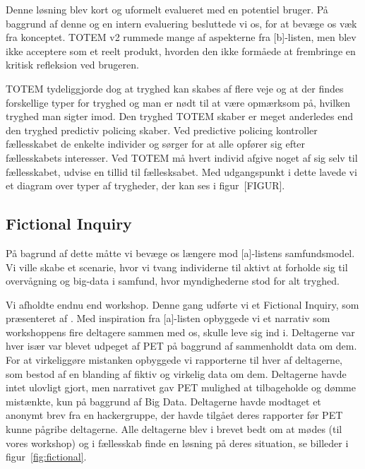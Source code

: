 Denne løsning blev kort og uformelt evalueret med en potentiel bruger. På baggrund af denne og en intern evaluering besluttede vi os, for at bevæge os væk fra konceptet. TOTEM v2 rummede mange af aspekterne fra [b]-listen, men blev ikke acceptere som et reelt produkt, hvorden den ikke formåede at frembringe en kritisk refleksion ved brugeren.

TOTEM tydeliggjorde dog at tryghed kan skabes af flere veje og at der findes forskellige typer for tryghed og man er nødt til at være opmærksom på, hvilken tryghed man sigter imod. Den tryghed TOTEM skaber er meget anderledes end den tryghed predictiv policing skaber. Ved predictive policing kontroller fællesskabet de enkelte individer og sørger for at alle opfører sig efter fællesskabets interesser. Ved TOTEM må hvert individ afgive noget af sig selv til fællesskabet, udvise en tillid til fællesksabet. Med udgangspunkt i dette lavede vi et diagram over typer af trygheder, der kan ses i figur~[FIGUR].


\subsection*{Fictional Inquiry}
På bagrund af dette måtte vi bevæge os længere mod [a]-listens samfundsmodel. Vi ville skabe et scenarie, hvor vi tvang individerne til aktivt at forholde sig til overvågning og big-data i samfund, hvor myndighederne stod for alt tryghed.

Vi afholdte endnu end workshop. Denne gang udførte vi et Fictional Inquiry, som præsenteret af \cite[]{Iversen:2008:PAI:1795234.1795254}. Med inspiration fra [a]-listen opbyggede vi et narrativ som workshoppens fire deltagere sammen med os, skulle leve sig ind i. Deltagerne var hver især var blevet udpeget af PET på baggrund af sammenholdt data om dem. For at virkeliggøre mistanken opbyggede vi rapporterne til hver af deltagerne, som bestod af en blanding af fiktiv og virkelig data om dem. Deltagerne havde intet ulovligt gjort, men narrativet gav PET mulighed at tilbageholde og dømme mistænkte, kun på baggrund af Big Data. Deltagerne havde modtaget et anonymt brev fra en hackergruppe, der havde tilgået deres rapporter før PET kunne pågribe deltagerne. Alle deltagerne blev i brevet bedt om at mødes (til vores workshop) og i fællesskab finde en løsning på deres situation, se billeder i figur~\ref{fig:fictional}.


